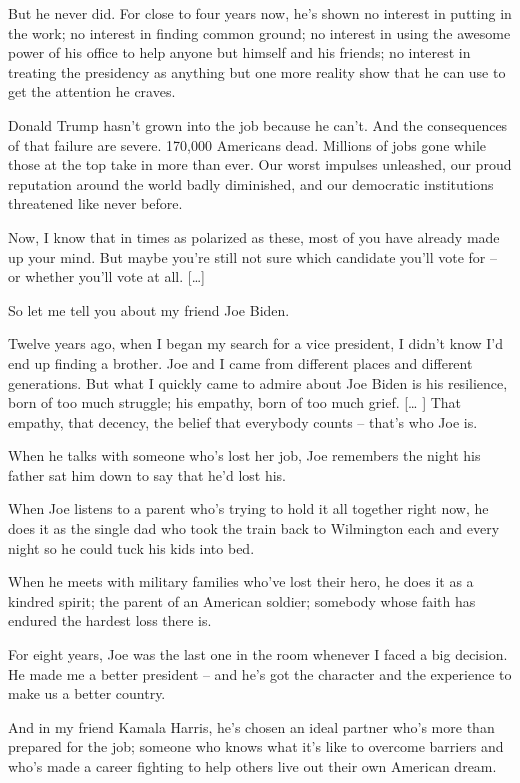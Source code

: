 \documentclass[10pt,a4paper]{article}
\begin{document}
But he never did. For close to four years now, he's shown no interest in putting in the work; no interest in finding common ground; no interest in using the awesome power of his office to help anyone but himself and his friends; no interest in treating the presidency as anything but one more reality show that he can use to get the attention he craves.

Donald Trump hasn't grown into the job because he can't. And the consequences of that failure are severe. 170,000 Americans dead. Millions of jobs gone while those at the top take in more than ever. Our worst impulses unleashed, our proud reputation around the world badly diminished, and our democratic institutions threatened like never before.

Now, I know that in times as polarized as these, most of you have already made up your mind. But maybe you're still not sure which candidate you'll vote for -- or whether you'll vote at all. […]

So let me tell you about my friend Joe Biden.

Twelve years ago, when I began my search for a vice president, I didn't know I'd end up finding a brother. Joe and I came from different places and different generations. But what I quickly came to admire about Joe Biden is his resilience, born of too much struggle; his empathy, born of too much grief. [… ] That empathy, that decency, the belief that everybody counts -- that's who Joe is.

When he talks with someone who's lost her job, Joe remembers the night his father sat him down to say that he'd lost his.

When Joe listens to a parent who's trying to hold it all together right now, he does it as the single dad who took the train back to Wilmington each and every night so he could tuck his kids into bed.

When he meets with military families who've lost their hero, he does it as a kindred spirit; the parent of an American soldier; somebody whose faith has endured the hardest loss there is.

For eight years, Joe was the last one in the room whenever I faced a big decision. He made me a better president -- and he's got the character and the experience to make us a better country.

And in my friend Kamala Harris, he's chosen an ideal partner who's more than prepared for the job; someone who knows what it's like to overcome barriers and who's made a career fighting to help others live out their own American dream.
\end{document}
